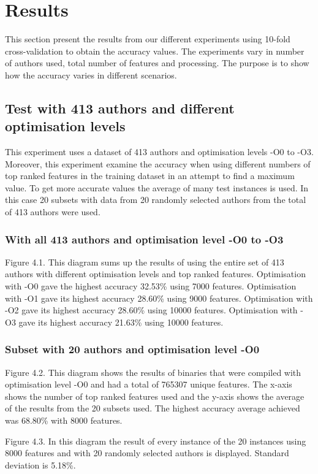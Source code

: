 \documentclass[a4paper,11pt]{kth-mag}
\begin{document}
\chapter{Results}
This section present the results from our different experiments using 10-fold
cross-validation to obtain the accuracy values. The experiments vary in number
of authors used, total number of features and processing. The purpose is to
show how the accuracy varies in different scenarios.  

\section{Test with 413 authors and different optimisation levels}
This experiment uses a dataset of 413 authors and optimisation levels -O0 to
-O3. Moreover, this experiment examine the accuracy when using different
numbers of top ranked features in the training dataset in an attempt to find a
maximum value. To get more accurate values the average of many test instances
is used. In this case 20 subsets with data from 20 randomly selected authors
from the total of 413 authors were used.

\subsection{With all 413 authors and optimisation level -O0 to -O3}
Figure 4.1. This diagram sums up the results of using the entire set of 413
authors with different optimisation levels and top ranked features.
Optimisation with -O0 gave the highest accuracy 32.53\% using 7000 features.
Optimisation with -O1 gave its highest accuracy 28.60\% using 9000 features.
Optimisation with -O2 gave its highest accuracy 28.60\% using 10000 features.
Optimisation with -O3 gave its highest accuracy 21.63\% using 10000 features. 


\subsection{Subset with 20 authors and optimisation level -O0}
Figure 4.2. This diagram shows the results of binaries that were compiled with
optimisation level -O0 and had a total of 765307 unique features. The x-axis
shows the number of top ranked features used  and the y-axis shows the average
of the results from the 20 subsets used. The highest accuracy average achieved
was 68.80\% with 8000 features. 

Figure 4.3. In this diagram the result of every instance of the 20 instances
using 8000 features and with 20 randomly selected authors is displayed.
Standard deviation is 5.18\%. 
\end{document}

